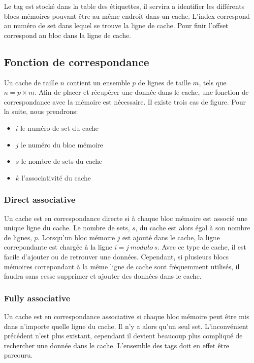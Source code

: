\documentclass[a4paper]{article}
\begin{document}
\indent Le tag est stocké dans la table des étiquettes, il servira a identifier les différents blocs mémoires pouvant être au même endroit dans un cache. L'index correspond au numéro de set dans lequel se trouve la ligne de cache. Pour finir l'offset correspond au bloc dans la ligne de cache.

\subsection{Fonction de correspondance}
\indent Un cache de taille $n$ contient un ensemble $p$ de lignes de taille $m$, tels que $n = p \times m$. Afin de placer et récupérer une donnée dans le cache, une fonction de correspondance avec la mémoire est nécessaire. Il existe trois cas de figure. Pour la suite, nous prendrons: \\
\begin{itemize}
\item $i$ le numéro de set du cache
\item $j$ le numéro du bloc mémoire
\item $s$ le nombre de sets du cache
\item $k$ l'associativité du cache 
\end{itemize}

\subsubsection{Direct associative}
\indent Un cache est en correspondance directe si à chaque bloc mémoire est associé une unique ligne du cache. Le nombre de sets, $s$, du cache est alors égal à son nombre de lignes, $p$. Lorsqu'un bloc mémoire $j$ est ajouté dans le cache, la ligne correpondante est chargée à la ligne $i = j\ modulo\ s$. Avec ce type de cache, il est facile d'ajouter ou de retrouver une données. Cependant, si plusieurs blocs mémoires correpondant à la même ligne de cache sont fréquemment utilisés, il faudra sans cesse supprimer et ajouter des données dans le cache.

\subsubsection{Fully associative}
\indent Un cache est en correspondance associative si chaque bloc mémoire peut être mis dans n'importe quelle ligne du cache. Il n'y a alors qu'un seul set. L'inconvénient précédent n'est plus existant, cependant il devient beaucoup plus compliqué de rechercher une donnée dans le cache. L'ensemble des tags doit en effet être parcouru.
\end{document}
